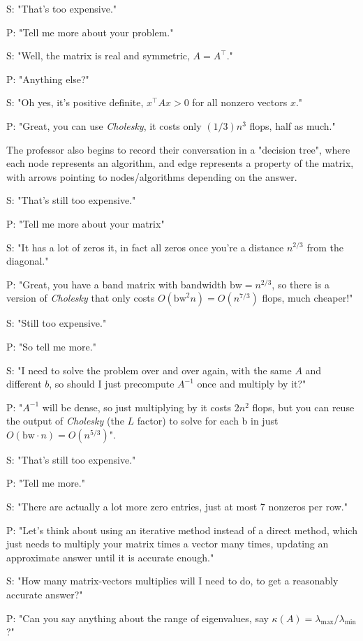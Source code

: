 \documentclass[11pt]{article}
\numberwithin{equation}{section}
\begin{document}
S: "That's too expensive."

P: "Tell me more about your problem."

S: "Well, the matrix is real and symmetric, $A=A^\top$."

P: "Anything else?"

S: "Oh yes, it's positive definite, $x^\top Ax > 0$ for all nonzero vectors $x$."

P: "Great, you can use \textit{Cholesky}, it costs only $(1/3)n^3$ flops, half as much." 

The professor also begins to record their conversation in a "decision tree", where each node represents  an algorithm, and edge represents a property of the matrix,
with arrows pointing to nodes/algorithms depending on the answer.

S: "That's still too expensive."

P: "Tell me more about your matrix"

S: "It has a lot of zeros it, in fact all zeros once you're a distance $n^{2/3}$ from the diagonal."

P: "Great, you have a band matrix with bandwidth $\mathrm{bw}=n^{2/3}$, so there is a version of \textit{Cholesky} that only costs $O(\mathrm{bw}^2 n) = O(n^{7/3})$ flops, 
much cheaper!"

S: "Still too expensive."

P: "So tell me more."

S: "I need to solve the problem over and over again, with the same $A$ and different $b$, so should I just precompute $A^{-1}$ once and multiply by it?"

P: "$A^{-1}$ will be dense, so just multiplying by it costs $2n^2$ flops, but you can reuse the output of \textit{Cholesky} (the $L$ factor)
to solve for each b in just $O(\mathrm{bw} \cdot n) = O(n^{5/3})$".

S: "That's still too expensive."

P: "Tell me more."

S: "There are actually a lot more zero entries, just at most 7 nonzeros per row."

P: "Let's think about using an iterative method instead of a direct method, which just needs to multiply your matrix times a vector many times, 
updating an approximate answer until it is accurate enough."

S: "How many matrix-vectors multiplies will I need to do, to get a reasonably accurate answer?"

P: "Can you say anything about the range of eigenvalues, say $\kappa(A) = \lambda_{\mathrm{max}} / \lambda_{\mathrm{min}}$?"
\end{document}
